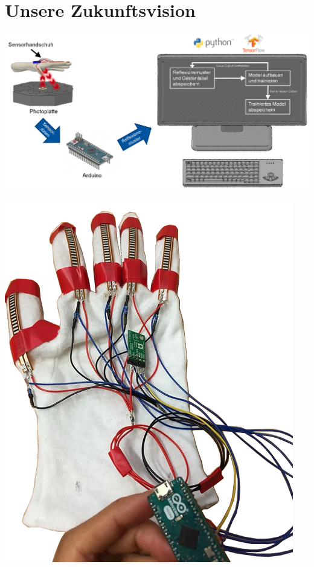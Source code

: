 \documentclass[a4paper,12pt,notumble]{leaflet}
\begin{document}
\noindent
\begin{minipage}[c][0.58\textheight][t]{\textwidth}
	
	\section{Unsere Zukunftsvision}
	
	\centering	
	
	\vspace{0.5cm}
	\includegraphics[scale=0.3]{../figures/Anlernphase.png}
	
	\vspace{0.5cm}
	\includegraphics[scale=0.3]{../figures/Sensorhandschuh_transparent.png}
	
\end{minipage}
\end{document}
